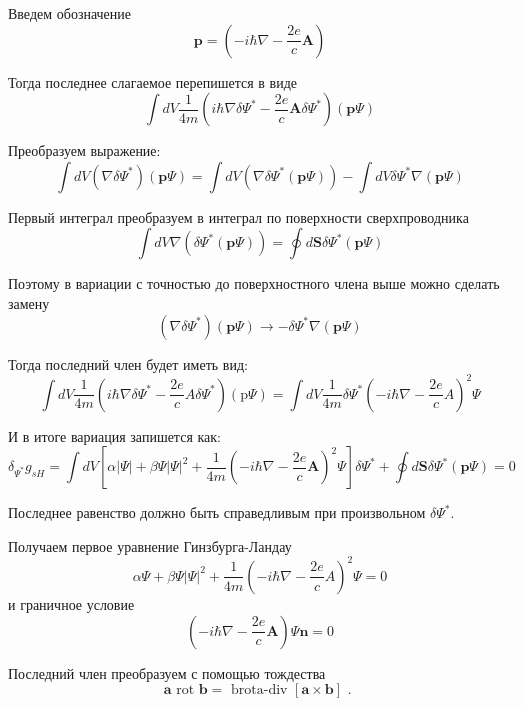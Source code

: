 \documentclass[a4paper,12pt]{article} %
\begin{document}
\begin{task}
Введем обозначение
$$
\mathbf{p}=\left(-i \hbar \nabla-\frac{2 e}{c} \mathbf{A}\right)
$$

Тогда последнее слагаемое перепишется в виде
$$
\int d V \frac{1}{4 m}\left(i \hbar \nabla \delta \Psi^{*}-\frac{2 e}{c} \mathbf{A} \delta \Psi^{*}\right)(\mathbf{p} \Psi)
$$






Преобразуем выражение:
$$
\int d V\left(\nabla \delta \Psi^{*}\right)(\mathbf{p} \Psi)
=
\int d V\left(\nabla \delta \Psi^{*}(\mathbf{p} \Psi)\right)
-
\int d V \delta \Psi^{*} \nabla(\mathbf{p} \Psi)
$$





Первый интеграл преобразуем в интеграл по поверхности сверхпроводника
$$
\int d V \nabla\left(\delta \Psi^{*}(\mathbf{p} \Psi)\right)
=
\oint d \mathbf{S} \delta \Psi^{*}(\mathbf{p} \Psi)
$$


Поэтому в вариации с точностью до поверхностного члена выше можно сделать замену
$$
\left(\nabla \delta \Psi^{*}\right)(\mathbf{p} \Psi) \rightarrow-\delta \Psi^{*} \nabla(\mathbf{p} \Psi)
$$



Тогда последний член будет иметь вид:
$$
\int d V \frac{1}{4 m}
\left(
i \hbar \nabla \delta \Psi^{*}-\frac{2 e}{c} A \delta \Psi^{*}
\right)(\mathrm{p} \Psi)
=
\int d V \frac{1}{4 m} 
\delta \Psi^{*}
\left(-i \hbar \nabla-\frac{2 e}{c} A\right)^{2} 
\Psi
$$



И в итоге вариация запишется как:
$$
\delta_{\Psi^{*}} g_{s H}
=
\int d V
\left[
\alpha|\Psi|
+
\beta \Psi|\Psi|^{2}
+
\frac{1}{4 m}
\left(-i \hbar \nabla-\frac{2 e}{c} \mathbf{A}\right)^{2} 
\Psi
\right] \delta \Psi^{*}
+
\oint d \mathbf{S} \delta \Psi^{*}(\mathbf{p} \Psi)
=
0
$$


Последнее равенство должно быть справедливым при произвольном $\delta \Psi^{*}$.



Получаем первое уравнение Гинзбурга-Ландау 
$$
\alpha \Psi
+
\beta \Psi|\Psi|^{2}
+
\frac{1}{4 m}\left(
-i \hbar \nabla-\frac{2 e}{c} A
\right)^{2} \Psi
=
0
$$
и граничное условие
\[ 	
\left(-i \hbar \nabla-\frac{2 e}{c} \mathbf{A}\right) \Psi \mathbf{n}=0 
\]





Последний член преобразуем с помощью тождества
$$
\mathbf{a}\text { rot }\mathbf{b} = \text { brota-div }[\mathbf{a} \times \mathbf{b}] \text { . }
$$



\end{task}
\end{document}
